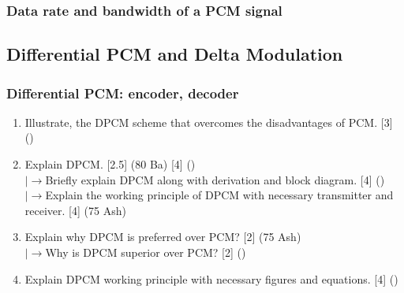 \documentclass[12pt]{article}
\newcommand{\lb}{\\$\left|\rightarrow\right.$}
\begin{document}
    \subsubsection{Data rate and bandwidth of a PCM signal}
  \subsection{Differential PCM and Delta Modulation}
    \subsubsection{Differential PCM: encoder, decoder}
      \begin{enumerate}
        \item Illustrate, the DPCM scheme that overcomes the disadvantages of PCM. \hfill [3] ()
        
        \item Explain DPCM. \hfill [2.5] (80 Ba) [4] ()
        \lb Briefly explain DPCM along with derivation and block diagram. \hfill [4] ()
        \lb Explain the working principle of DPCM with necessary transmitter and receiver. \hfill [4] (75 Ash)
        
        \item Explain why DPCM is preferred over PCM? \hfill [2] (75 Ash)
        \lb Why is DPCM superior over PCM? \hfill [2] ()
        
        \item Explain DPCM working principle with necessary figures and equations. \hfill [4] ()
      \end{enumerate}
\end{document}
